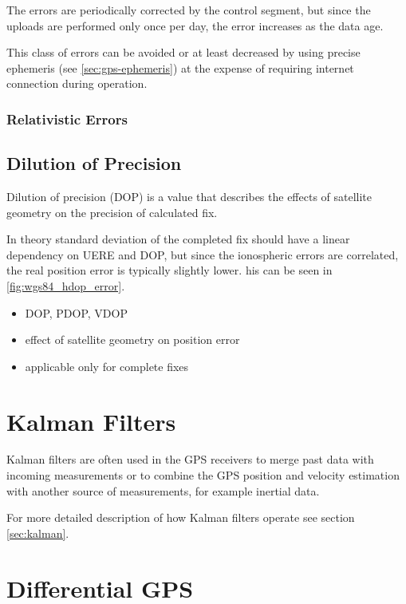 The errors are periodically corrected by the control segment, but since the uploads are performed
only once per day, the error increases as the data age.

This class of errors can be avoided or at least decreased by using precise ephemeris (see \autoref{sec:gps-ephemeris})
at the expense of requiring internet connection during operation.

\subsubsection{Relativistic Errors}

\subsection{Dilution of Precision}
\label{sec:gps-dop}

Dilution of precision (DOP) is a value that describes the effects of satellite geometry
on the precision of calculated fix.

In theory standard deviation of the completed fix should have a linear dependency on
UERE and DOP, but since the ionospheric errors are correlated, the real position error is
typically slightly lower.
his can be seen in \autoref{fig:wgs84_hdop_error}.

\begin{itemize}
\item DOP, PDOP, VDOP
\item effect of satellite geometry on position error
\item applicable only for complete fixes
\end{itemize}

\section{Kalman Filters}
Kalman filters are often used in the GPS receivers to merge past
data with incoming measurements or to combine the GPS position and velocity
estimation with another source of measurements, for example inertial data.

For more detailed description of how Kalman filters operate see section
\ref{sec:kalman}.

\section{Differential GPS}
\label{sec:dgps}

